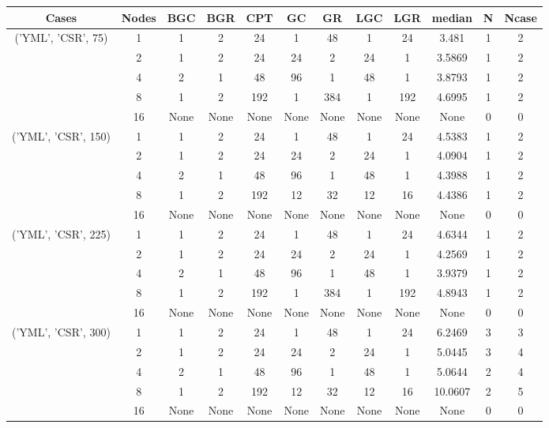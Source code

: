 \begin{tabular}{cccccccccccc}
\hline
Cases & Nodes& BGC& BGR& CPT& GC& GR& LGC& LGR& median & N & Ncase \\
\hline
\multirow{5}{*}{('YML', 'CSR', 75)}& 1& 1& 2& 24& 1& 48& 1& 24& 3.481& 1& 2\\
& 2& 1& 2& 24& 24& 2& 24& 1& 3.5869& 1& 2\\
& 4& 2& 1& 48& 96& 1& 48& 1& 3.8793& 1& 2\\
& 8& 1& 2& 192& 1& 384& 1& 192& 4.6995& 1& 2\\
& 16& None& None& None& None& None& None& None& None& 0& 0\\
\hline
\multirow{5}{*}{('YML', 'CSR', 150)}& 1& 1& 2& 24& 1& 48& 1& 24& 4.5383& 1& 2\\
& 2& 1& 2& 24& 24& 2& 24& 1& 4.0904& 1& 2\\
& 4& 2& 1& 48& 96& 1& 48& 1& 4.3988& 1& 2\\
& 8& 1& 2& 192& 12& 32& 12& 16& 4.4386& 1& 2\\
& 16& None& None& None& None& None& None& None& None& 0& 0\\
\hline
\multirow{5}{*}{('YML', 'CSR', 225)}& 1& 1& 2& 24& 1& 48& 1& 24& 4.6344& 1& 2\\
& 2& 1& 2& 24& 24& 2& 24& 1& 4.2569& 1& 2\\
& 4& 2& 1& 48& 96& 1& 48& 1& 3.9379& 1& 2\\
& 8& 1& 2& 192& 1& 384& 1& 192& 4.8943& 1& 2\\
& 16& None& None& None& None& None& None& None& None& 0& 0\\
\hline
\multirow{5}{*}{('YML', 'CSR', 300)}& 1& 1& 2& 24& 1& 48& 1& 24& 6.2469& 3& 3\\
& 2& 1& 2& 24& 24& 2& 24& 1& 5.0445& 3& 4\\
& 4& 2& 1& 48& 96& 1& 48& 1& 5.0644& 2& 4\\
& 8& 1& 2& 192& 12& 32& 12& 16& 10.0607& 2& 5\\
& 16& None& None& None& None& None& None& None& None& 0& 0\\
\hline
\end{tabular}



